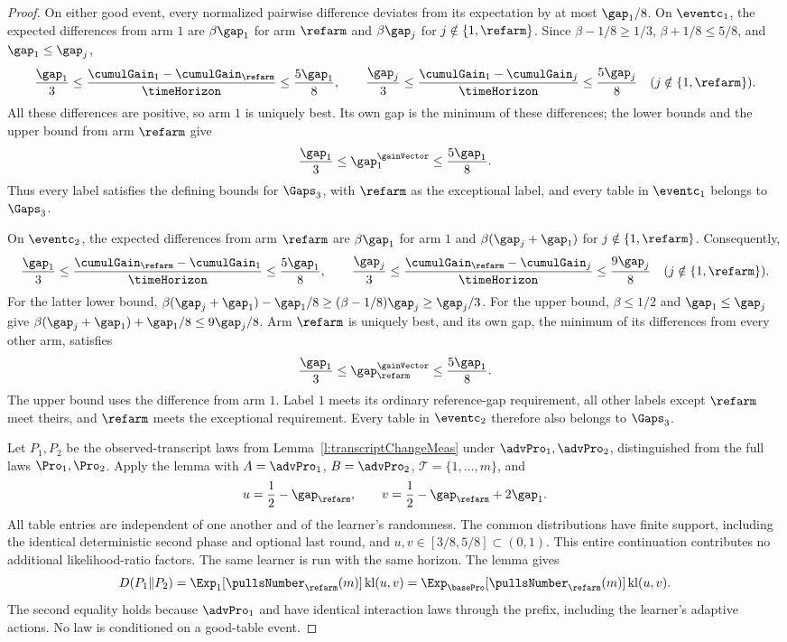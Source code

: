 \begin{proof}
On either good event, every normalized pairwise difference deviates
from its expectation by at most $\gap_1/8$.
On $\eventc_1$, the expected differences from arm $1$ are
$\beta\gap_1$ for arm $\refarm$ and $\beta\gap_j$ for
$j\notin\{1,\refarm\}$. Since
$\beta-1/8\geq1/3$, $\beta+1/8\leq5/8$, and $\gap_1\leq\gap_j$,
\[
\frac{\gap_1}{3}\leq
\frac{\cumulGain_1-\cumulGain_{\refarm}}{\timeHorizon}
\leq\frac{5\gap_1}{8},\qquad
\frac{\gap_j}{3}\leq
\frac{\cumulGain_1-\cumulGain_j}{\timeHorizon}
\leq\frac{5\gap_j}{8}
\quad(j\notin\{1,\refarm\}).
\]
All these differences are positive, so arm $1$ is uniquely best.
Its own gap is the minimum of these differences; the lower bounds
and the upper bound from arm $\refarm$ give
\[
\frac{\gap_1}{3}\leq\gap_1^{\gainVector}\leq\frac{5\gap_1}{8}.
\]
Thus every label satisfies the defining bounds for $\Gaps_3$, with
$\refarm$ as the exceptional label, and every table in $\eventc_1$
belongs to $\Gaps_3$.

On $\eventc_2$, the expected differences from arm $\refarm$ are
$\beta\gap_1$ for arm $1$ and $\beta(\gap_j+\gap_1)$ for
$j\notin\{1,\refarm\}$. Consequently,
\[
\frac{\gap_1}{3}\leq
\frac{\cumulGain_{\refarm}-\cumulGain_1}{\timeHorizon}
\leq\frac{5\gap_1}{8},\qquad
\frac{\gap_j}{3}\leq
\frac{\cumulGain_{\refarm}-\cumulGain_j}{\timeHorizon}
\leq\frac{9\gap_j}{8}
\quad(j\notin\{1,\refarm\}).
\]
For the latter lower bound,
$\beta(\gap_j+\gap_1)-\gap_1/8
\geq(\beta-1/8)\gap_j\geq\gap_j/3$.
For the upper bound, $\beta\leq1/2$ and $\gap_1\leq\gap_j$ give
$\beta(\gap_j+\gap_1)+\gap_1/8\leq9\gap_j/8$.
Arm $\refarm$ is uniquely best, and its own gap, the minimum of
its differences from every other arm, satisfies
\[
\frac{\gap_1}{3}\leq\gap_{\refarm}^{\gainVector}\leq\frac{5\gap_1}{8}.
\]
The upper bound uses the difference from arm $1$. Label $1$ meets
its ordinary reference-gap requirement, all other labels except
$\refarm$ meet theirs, and $\refarm$ meets the exceptional requirement.
Every table in $\eventc_2$ therefore also belongs to $\Gaps_3$.

Let $P_1,P_2$ be the observed-transcript laws from
Lemma~\ref{l:transcriptChangeMeas} under $\advPro_1,\advPro_2$,
distinguished from the full laws $\Pro_1,\Pro_2$.
Apply the lemma with $A=\advPro_1$, $B=\advPro_2$,
$\mathcal T=\{1,\ldots,m\}$, and
\[
u=\frac12-\gap_{\refarm},\qquad
v=\frac12-\gap_{\refarm}+2\gap_1.
\]
All table entries are independent of one another and of the learner's
randomness. The common distributions have finite support, including
the identical deterministic second phase and optional last round,
and $u,v\in[3/8,5/8]\subset(0,1)$. This entire continuation contributes
no additional likelihood-ratio factors.
The same learner is run with the same horizon.
The lemma gives
\[
D(P_1\Vert P_2)
=\Exp_1[\pullsNumber_{\refarm}(m)]\operatorname{kl}(u,v)
=\Exp_{\basePro}[\pullsNumber_{\refarm}(m)]\operatorname{kl}(u,v).
\]
The second equality holds because $\advPro_1$ and \basePro{} have
identical interaction laws through the prefix, including the learner's
adaptive actions. No law is conditioned on a good-table event.


\end{proof}
